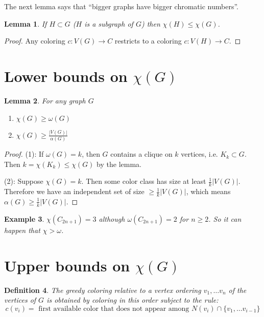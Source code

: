 \documentclass[a4paper]{article}
\theoremstyle{plain}
\newtheorem{lemma}{Lemma}
\newtheorem{definition}[lemma]{Definition}
\theoremstyle{myremark}
\newtheorem{example}[lemma]{Example}
\begin{document}
The next lemma says that ``bigger graphs have bigger chromatic
numbers''.
\begin{lemma}
If $H \subset G$ ($H$ is a subgraph of $G$) then $\chi(H) \le \chi(G)$.
\end{lemma}
\begin{proof}
Any coloring $c \colon V(G) \rightarrow C$ restricts to a coloring $c
\colon V(H) \rightarrow C$.
\end{proof}

\section*{Lower bounds on $\chi(G)$}
\begin{lemma}
For any graph $G$
\begin{enumerate}[(1)]
\item $\chi(G) \ge \omega(G)$
\item $\chi(G) \ge \frac{|V(G)|}{\alpha(G)}$
\end{enumerate}
\end{lemma}
\begin{proof}
(1): If $\omega(G) = k$, then $G$ contains a clique on $k$ vertices,
i.e. $K_k \subset G$. Then $k = \chi(K_k) \le \chi(G)$ by the lemma.

(2): Suppose $\chi(G) = k$. Then some color class has size at least
$\frac{1}{k}|V(G)|$. Therefore we have an independent set of size $\ge
\frac{1}{k}|V(G)|$, which means $\alpha(G) \ge \frac{1}{k}|V(G)|$.
\end{proof}

\begin{example}
$\chi(C_{2n + 1}) = 3$ although $\omega(C_{2n + 1}) = 2$ for $n \ge 2$.
So it can happen that $\chi > \omega$.
\end{example}

\section*{Upper bounds on $\chi(G)$}
\begin{definition}
\emph{The greedy coloring} relative to a vertex ordering $v_1, \ldots
v_n$ of the vertices of $G$ is obtained by coloring in this order
subject to the rule:
\[
c(v_i) = \text{ first available color that does not appear among }
N(v_i) \cap \{v_1,\ldots v_{i-1}\}
\]
\end{definition}
\end{document}
